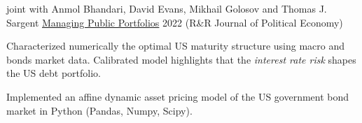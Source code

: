 

\begin{cventries}
	\cventry
	{joint with Anmol Bhandari, David Evans, Mikhail Golosov and Thomas J. Sargent} %
	{\href{https://static1.squarespace.com/static/54c19f18e4b0ef5f4b9f8dae/t/6328ee5213a65c43a48423f8/1663626851912/abegs4draft.pdf}{Managing Public Portfolios}}  %
	{2022} %
	{(R\&R Journal of Political Economy)} %
	{\begin{cvitems}
			\item Characterized numerically the optimal US maturity structure using macro and bonds market data. Calibrated model highlights that the \textit{interest rate risk} shapes the US debt portfolio.
			\item Implemented an affine dynamic asset pricing model of the US government bond market in Python (Pandas, Numpy, Scipy).
		\end{cvitems}}
\end{cventries}
